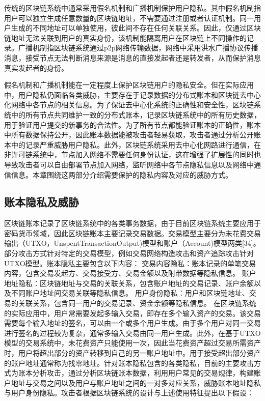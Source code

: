 传统的区块链系统中通常采用假名机制和广播机制保护用户隐私。其中假名机制指用户可以独立生成任意数量的区块链地址，不需要通过注册或者认证机制。同一用户生成的不同地址可以单独使用，彼此间不存在任何关联关系。因此，仅通过区块链地址无法关联到用户的真实身份，该机制能隔离用户在区块链上不同操作的记录。广播机制指区块链系统通过p2p网络传输数据，网络中采用洪水广播协议传播消息，接受节点无法判断消息来源是消息的直接发起者还是转发者，从而保护消息真实发起者的身份。

假名机制和广播机制能在一定程度上保护区块链用户的隐私安全。但在实际应用中，用户隐私仍面临各类威胁，主要存在于记录数据的分布式账本和区块链去中心化网络中各节点的相关信息。为了保证去中心化系统的正确性和安全性，区块链系统中的所有节点共同维护一致的分布式账本，记录区块链系统中的所有历史数据，用于验证用户提交的新事务的合法性。为了所有节点都能验证账本的正确性，账本中所有数据保持公开，因此账本数据能被攻击者轻易获取，攻击者通过分析公开账本中的记录严重威胁用户隐私。此外，区块链系统采用去中心化网路进行通信，在非许可链系统中，节点加入网络不需要任何身份认证，这在增强了扩展性的同时也导致攻击者可以自由部署节点加入网络，监听网络中各节点隐私信息以及网络中通信信息。本章围绕这两部分介绍需要保护的隐私内容及对应的威胁方式。

\subsection{账本隐私及威胁}

区块链账本记录了区块链系统中的各类事务数据，由于目前区块链系统主要应用于密码货币领域，因此区块链账本主要记录交易数据。交易模型主要分为未花费交易输出（UTXO，UnspentTransactionOutput)模型和账户（Account)模型两类[34]。部分攻击方式针对特定的交易模型，例如交易网络构造攻击和资产追踪攻击针对UTXO模型。账本隐私主要包含以下内容：
交易内容隐私：账本记录的单笔交易内容，包含交易发起方、交易接受方、交易金额以及附带数据等隐私信息。
账户地址隐私：区块链地址与交易的关联关系，包含账户地址的交易记录、账户余额以及不同账户地址间交易关联等隐私信息。
用户身份隐私：用户和区块链地址、交易的关联关系，包含同一用户的交易记录、资金余额等隐私信息。
在区块链系统的实际应用中，用户常需要发起多输入交易，即存在多个输入资产的交易。该交易需要每个输入地址的签名，可以由一个或多个用户生成。由于多个用户对同一交易进行签名的过程较为复杂，通常多输入交易由同一用户生成。此外，在基于UTXO模型的交易系统中，未花费资产只能使用一次，因此当花费资产超过交易所需资产时，用户将超出部分的资产转移到自己的另一账户地址中。用于接受超出部分资产的账户地址通常称为找零地址。针对账本隐私包含的各类隐私，目前的主要攻击方式为账本分析攻击，通过分析区块链账本数据，利用用户常见的交易规律，构建账户地址与交易之间以及用户与账户地址之间的一对多对应关系，威胁账本地址隐私与用户身份隐私。攻击者根据区块链系统的设计与上述使用特征提出以下假设：

